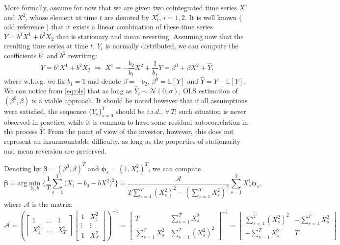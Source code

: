\documentclass[a4paper,11pt]{article}
\theoremstyle{remark}
\theoremstyle{plain}
\newcommand\ab[1]{{\color{blue} #1 }}
\begin{document}
More formally, assume for now that we are given two cointegrated time series $X^1$ and $X^2$, whose element at time $t$ are denoted by $X^i_t$, $i=1,2$. It is well known (\ab{add reference}) that it exists a linear combination of these time series $Y=b^1X^1+b^2X_2$ that is stationary and mean reverting. Assuming now that the resulting time series at time $t$, $Y_t$ is normally distributed, we can compute the coefficients $b^1$ and $b^2$ rewriting:
\begin{equation}
\label{eq:ols}
Y=b^1X^1+b^2X_2\;\Rightarrow\;X^1=-\frac{b_2}{b_1}X^2+\frac{1}{b_1}Y=\beta^0+\beta X^2+\hat{Y},
\end{equation}
where w.l.o.g. we fix $b_1=1$ and denote $\beta=-b_2$, $\beta^0=\mathbb{E}[Y]$ and $\hat{Y}=Y-\mathbb{E}[Y]$. We can notice from \eqref{eq:ols} that as long as $\hat{Y}_t\sim\mathcal{N}(0,\sigma)$, OLS estimation of $(\beta^0,\beta)$ is a viable approach. 
It should be noted however that if all assumptions were satisfied, the sequence $\{Y_s\}_{s=0}^T$ should be $i.i.d.$, $\forall\,T$; such situation is never observed in practice, while it is common to have some residual autocorrelation in the process $\hat{Y}$. From the point of view of the investor, however, this does not represent an insurmountable difficulty, as long as the properties of stationarity and mean reversion are preserved.

Denoting by $\boldsymbol{\beta}=(\beta^0,\beta)^T$ and $\boldsymbol{\phi}_s=(1, X^2_s)^T$, we can compute
\begin{equation}
\label{eq:simpleOLS}
\boldsymbol{\beta}=\text{arg}\min\limits_{b_0,b}\Big\{\frac{1}{T}\sum\limits_{s=1}^{T}\big(X_1-b_0-b X^2\big)^2 \Big\}=\frac{\mathcal{A}}{T\sum\limits_{s=1}^{T}(X^2_s)^2-\left(\sum\limits_{s=1}^{T}X^2_s\right)^2}\sum\limits_{s=1}^{T}X^1_s \boldsymbol{\phi}_s,
\end{equation}
where $\mathcal{A}$ is the matrix:
\[
\mathcal{A}=\left(\begin{bmatrix}
    1 & \dots & 1\\
    X^2_1 & \dots & X^2_T 
\end{bmatrix}
\begin{bmatrix}
    1 & X^2_1 \\
    \vdots & \vdots \\
     1 & X^2_T
\end{bmatrix}
\right)^{-1}=\begin{bmatrix}
     T & \sum_{s=1}^{T}X^2_s \\
    \sum_{s=1}^{T}X^2_s & \sum_{s=1}^{T}(X^2_s)^2
\end{bmatrix}^{-1}=\begin{bmatrix}
    \sum_{s=1}^{T}(X^2_s)^2 & - \sum_{s=1}^{T}X^2_s \\
    - \sum_{s=1}^{T}X^2_s & T
\end{bmatrix}
\]
\end{document}
